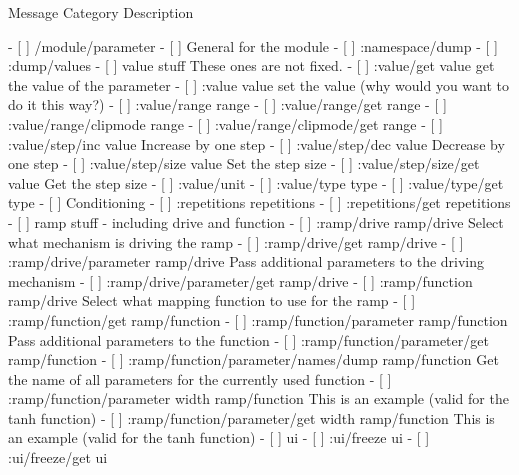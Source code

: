 Message                                               Category       Description

- [ ] /module/parameter
    - [ ] General for the module
        - [ ] :namespace/dump
        - [ ] :dump/values
    - [ ] value stuff                                                These ones are not fixed.
        - [ ] :value/get                              value          get the value of the parameter
        - [ ] :value                                  value          set the value (why would you want to do it this way?)
        - [ ] :value/range                            range
        - [ ] :value/range/get                        range
        - [ ] :value/range/clipmode                   range
        - [ ] :value/range/clipmode/get               range
        - [ ] :value/step/inc                         value          Increase by one step
        - [ ] :value/step/dec                         value          Decrease by one step
        - [ ] :value/step/size                        value          Set the step size
        - [ ] :value/step/size/get                    value          Get the step size
        - [ ] :value/unit
        - [ ] :value/type                             type
        - [ ] :value/type/get                         type
    - [ ] Conditioning
        - [ ] :repetitions                            repetitions
        - [ ] :repetitions/get                        repetitions
    - [ ] ramp stuff - including drive and function
        - [ ] :ramp/drive                             ramp/drive     Select what mechanism is driving the ramp
        - [ ] :ramp/drive/get                         ramp/drive
        - [ ] :ramp/drive/parameter                   ramp/drive     Pass additional parameters to the driving mechanism
        - [ ] :ramp/drive/parameter/get               ramp/drive
        - [ ] :ramp/function                          ramp/drive     Select what mapping function to use for the ramp
        - [ ] :ramp/function/get                      ramp/function
        - [ ] :ramp/function/parameter                ramp/function  Pass additional parameters to the function
        - [ ] :ramp/function/parameter/get            ramp/function
        - [ ] :ramp/function/parameter/names/dump     ramp/function  Get the name of all parameters for the currently used function
        - [ ] :ramp/function/parameter width          ramp/function  This is an example (valid for the tanh function)
        - [ ] :ramp/function/parameter/get width      ramp/function  This is an example (valid for the tanh function)
    - [ ] ui
        - [ ] :ui/freeze                              ui
        - [ ] :ui/freeze/get                          ui